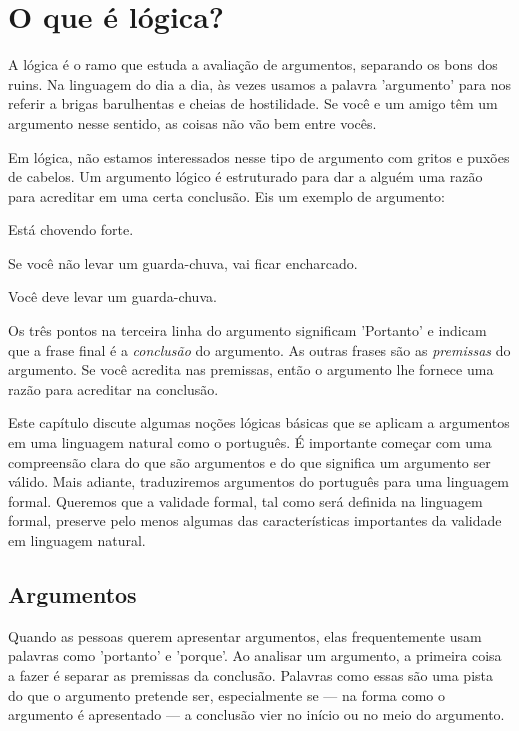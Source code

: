 \chapter{O que é lógica?}
\label{ch.intro}

A lógica é o ramo que estuda a avaliação de argumentos, separando os bons dos ruins. Na linguagem do dia a dia, às vezes usamos a palavra 'argumento' para nos referir a brigas barulhentas e cheias de hostilidade. Se você e um amigo têm um argumento nesse sentido, as coisas não vão bem entre vocês.

Em lógica, não estamos interessados nesse tipo de argumento com gritos e puxões de cabelos. Um argumento lógico é estruturado para dar a alguém uma razão para acreditar em uma certa conclusão. Eis um exemplo de argumento:

\label{argRaining}
\begin{earg}
\item[(1)] Está chovendo forte.
\item[(2)] Se você não levar um guarda-chuva, vai ficar encharcado.
\item[\therefore] Você deve levar um guarda-chuva.
\end{earg}

Os três pontos na terceira linha do argumento significam 'Portanto' e indicam que a frase final é a \emph{conclusão} do argumento. As outras frases são as \emph{premissas} do argumento. Se você acredita nas premissas, então o argumento lhe fornece uma razão para acreditar na conclusão.

Este capítulo discute algumas noções lógicas básicas que se aplicam a argumentos em uma linguagem natural como o português. É importante começar com uma compreensão clara do que são argumentos e do que significa um argumento ser válido. Mais adiante, traduziremos argumentos do português para uma linguagem formal. Queremos que a validade formal, tal como será definida na linguagem formal, preserve pelo menos algumas das características importantes da validade em linguagem natural.

\section{Argumentos}
Quando as pessoas querem apresentar argumentos, elas frequentemente usam palavras como 'portanto' e 'porque'. Ao analisar um argumento, a primeira coisa a fazer é separar as premissas da conclusão. Palavras como essas são uma pista do que o argumento pretende ser, especialmente se --- na forma como o argumento é apresentado --- a conclusão vier no início ou no meio do argumento.

